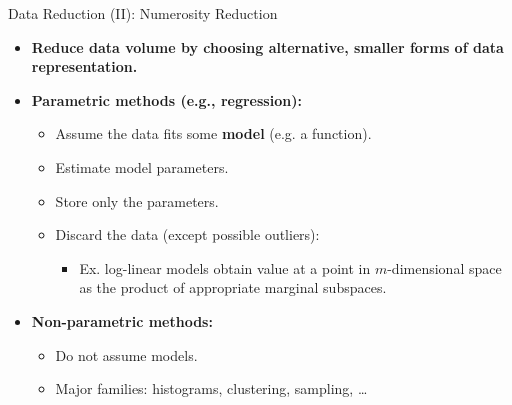 \begin{frame}{Data Reduction (II): Numerosity Reduction}
	\begin{itemize}
		\item \textbf{Reduce data volume by choosing alternative,
			      {\color{airforceblue}smaller} forms of data representation.}
		\item \textbf{{\color{airforceblue}Parametric} methods (e.g.,
			      regression):}
		      \begin{itemize}
			      \item Assume the data fits some
			            \textbf{{\color{airforceblue}model}} (e.g. a function).
			      \item Estimate model parameters.
			      \item Store only the parameters.
			      \item Discard the data (except possible outliers):
			            \begin{itemize}
				            \item Ex. log-linear models obtain value at a point in
				                  $m$-dimensional space as the product of appropriate marginal
				                  subspaces.
			            \end{itemize}
		      \end{itemize}
		\item \textbf{{\color{airforceblue}Non-parametric} methods:}
		      \begin{itemize}
			      \item Do not assume models.
			      \item Major families: histograms, clustering, sampling, \ldots
		      \end{itemize}
	\end{itemize}
\end{frame}

